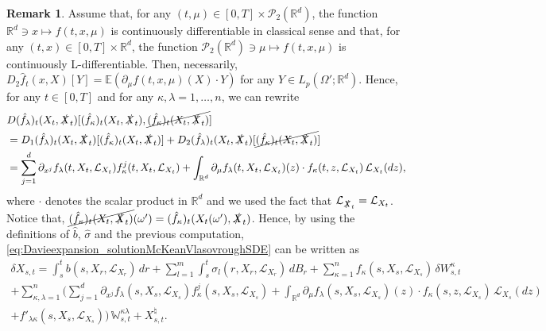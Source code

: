 \documentclass[10pt, a4paper]{article} %
\newcommand{\R}{\mathbb{R}}
\newcommand{\E}{\mathbb{E}}
\theoremstyle{definition}
\newtheorem{rmk}[defn]{Remark}
\theoremstyle{plain}
\begin{document}
\begin{rmk} \label{rmk:FréchetderivativesinDavieexpansion}
    Assume that, for any $(t,\mu) \in [0,T] \times \mathcal{P}_2(\R^d)$, the function $\R^d \ni x \mapsto f(t, x,\mu)$ is continuously differentiable in classical sense and that, for any $(t,x) \in [0,T] \times \R^d$, the function $\mathcal{P}_2(\R^d) \ni \mu \mapsto f(t, x,\mu)$ is continuously L-differentiable. Then, necessarily, $D_2 \hat f_t(x,X)[Y] = \E(\partial_\mu f(t,x,\mu) (X) \cdot Y)$ for any $Y \in L_p(\Omega';\R^d)$.
    Hence, for any $t \in [0,T]$ and for any $\kappa,\lambda =1,\dots,n$, we can rewrite  \begin{align*} 
        &D(\hat{f}_\lambda)_t(X_t,\slashed{X}_t) [(\hat{f}_\kappa)_t(X_t,\slashed{X}_t), \cancel{(\hat{f}_\kappa)_t(X_t,\slashed{X}_t)}]   \\
        &= D_1(\hat{f}_\lambda)_t(X_t,\slashed{X}_t) [(\hat{f}_\kappa)_t(X_t,\slashed{X}_t)]  +D_2(\hat{f}_\lambda)_t(X_t,\slashed{X}_t) [\cancel{(\hat{f}_\kappa)_t(X_t,\slashed{X}_t)}]   \\ 
        &= \sum_{j=1}^d \partial_{x^j} f_\lambda(t, X_t, \mathcal{L}_{X_t}) f_\kappa^j(t, X_t, \mathcal{L}_{X_t}) + \int_{\R^d} \partial_\mu f_\lambda (t, X_t,\mathcal{L}_{X_t}) (z) \cdot f_\kappa(t, z,\mathcal{L}_{X_t}) \, \mathcal{L}_{X_t}(dz) ,
    \end{align*}
    where $\cdot$ denotes the scalar product in $\R^d$ and we used the fact that $\mathcal{L}_{\slashed{X}_t} = \mathcal{L}_{X_t}$. 
    Notice that, $\cancel{(\hat{f}_\kappa)_t(X_t,\slashed{X}_t)}(\omega') = (\hat{f}_\kappa)_t(X_t(\omega'),\slashed{X}_t)$. 
    Hence, by using the definitions of $\hat{b}$, $\hat{\sigma}$ and the previous computation, 
    \eqref{eq:Davieexpansion_solutionMcKeanVlasovroughSDE} can be written as \begin{multline*} 
            \delta X_{s,t} = \int_s^t b(s, X_r,\mathcal{L}_{X_r}) \, dr + \sum_{l=1}^m \int_s^t \sigma_l (r, X_r,\mathcal{L}_{X_r}) \, dB_r + \sum_{\kappa=1}^n f_\kappa(s, X_s,\mathcal{L}_{X_s}) \,  \delta W^\kappa_{s,t}  \\ + \sum_{\kappa,\lambda=1}^n \Big(\sum_{j=1}^d \partial_{x^j} f_\lambda(s, X_s, \mathcal{L}_{X_s}) f_\kappa^j(s, X_s, \mathcal{L}_{X_s}) + \int_{\R^d} \partial_\mu f_\lambda (s, X_s,\mathcal{L}_{X_s}) (z) \cdot f_\kappa(s, z,\mathcal{L}_{X_s}) \, \mathcal{L}_{X_s}(dz)  \\ + f'_{\lambda \kappa}(s, X_s,\mathcal{L}_{X_s}) \Big) \, \mathbb{W}^{\kappa \lambda}_{s,t} + X^\natural_{s,t} .
            \end{multline*}
\end{rmk}
\end{document}
